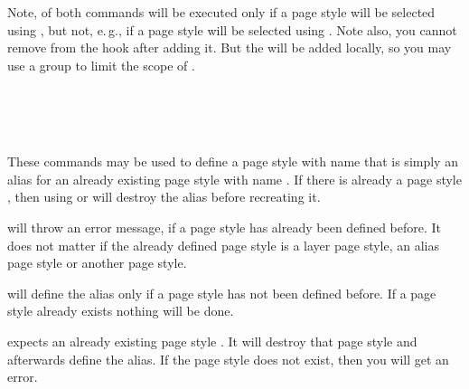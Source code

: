 Note,  of both commands will be executed
only if a page style will be selected using , but not,
e.\,g., if a page style will be selected using . Note
also, you cannot remove  from the hook after adding it. But
the  will be added locally, so you may use a group to limit the
scope of .%

\begin{Declaration}
  \\
  \\
  \\
\end{Declaration}
%
%
%
%
These commands may be used to define a page style with name  that is simply an alias for an already existing page style with
name . If there is already a page style
, then using  or
 will destroy the alias before recreating it.

 will throw an error message, if a page style
 has already been defined before. It does not
matter if the already defined page style is a layer page style, an alias page
style or another page style.

 will define the alias only if a page style
 has not been defined before. If a page style
 already exists nothing will be done.

 expects an already existing page style
. It will destroy that page style and afterwards
define the alias. If the page style  does not
exist, then you will get an error.%
%
%
%

